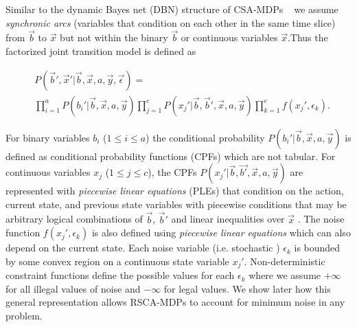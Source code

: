  
Similar to the dynamic Bayes net (DBN) structure of CSA-MDPs ~\cite{sdp_aaai} 
we assume \emph{synchronic arcs} (variables that condition on each
other in the same time slice) from $\vec{b}$ to $\vec{x}$ but not within the binary $\vec{b}$ or continuous variables $\vec{x}$.Thus the factorized joint transition model is defined as

{\footnotesize
\begin{align}
& P(\vec{b}',\vec{x}'|\vec{b},\vec{x}, a,\vec{y},\vec{\epsilon}) = \nonumber  \\
& %
\prod_{i=1}^a P(b_i'|\vec{b},\vec{x} ,a,\vec{y}) 
\prod_{j=1}^c P(x_j'|\vec{b},\vec{b}',\vec{x},a,\vec{y})
\prod_{k=1}^e f(x_j', \epsilon_k).  \nonumber
\end{align}
}

For binary variables $b_i$ ($1 \leq i \leq a$) the conditional probability $P(b_i'|\vec{b},\vec{x},a,\vec{y})$ is defined as 
conditional probability functions (CPFs) which are not tabular.   
For continuous variables $x_j$ ($1 \leq j \leq c$), the CPFs $P(x_j'|\vec{b},\vec{b'},\vec{x},a,\vec{y})$ are represented with \emph{piecewise linear equations} (PLEs) that condition on the action, current state, and previous state variables with piecewise conditions that may be arbitrary logical combinations of $\vec{b}$, $\vec{b}'$  and linear inequalities over $\vec{x}$ .  
The noise function $f(x_j',\epsilon_k)$ is also defined using \emph{piecewise linear equations} which can also depend on the current state. 
Each noise variable (i.e. stochastic ) $\epsilon_k$ is bounded by some convex region on a continuous state variable $x_j'$. Non-deterministic constraint functions define the possible values for each $\epsilon_k$ where we assume $+ \infty$ for all illegal values of noise and $-\infty$ for legal values. We show later how this general representation allows RSCA-MDPs to account for minimum noise in any problem. 

